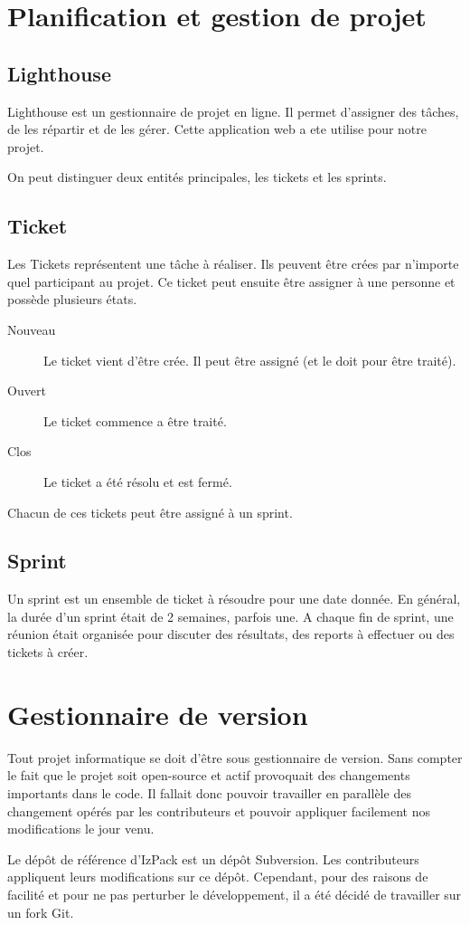 \section{Planification et gestion de projet}
\subsection{Lighthouse}
Lighthouse est un gestionnaire de projet en ligne. Il permet d'assigner des tâches, de les répartir et de les gérer.
Cette application web a ete utilise pour notre projet.

On peut distinguer deux entités principales, les tickets et les sprints.
\subsection{Ticket}
Les Tickets représentent une tâche à réaliser. Ils peuvent être crées par n'importe quel participant au projet. Ce ticket peut ensuite être assigner à une personne et possède plusieurs états.
\begin{description}
\item[Nouveau] Le ticket vient d'être crée. Il peut être assigné (et le doit pour être traité).
\item[Ouvert] Le ticket commence a être traité.
\item[Clos] Le ticket a été résolu et est fermé.
\end{description}
Chacun de ces tickets peut être assigné à un sprint.
\subsection{Sprint}
Un sprint est un ensemble de ticket à résoudre pour une date donnée. En général, la durée d'un sprint était de 2 semaines, parfois une. A chaque fin de sprint, une réunion était organisée pour discuter des résultats, des reports à effectuer ou des tickets à créer.
\section{Gestionnaire de version}
Tout projet informatique se doit d'être sous gestionnaire de version. Sans compter le fait que le projet soit open-source et actif provoquait des changements importants dans le code. Il fallait donc pouvoir travailler en parallèle des changement opérés par les contributeurs et pouvoir appliquer facilement nos modifications le jour venu.

Le dépôt de référence d'IzPack est un dépôt Subversion. Les contributeurs appliquent leurs modifications sur ce dépôt. Cependant, pour des raisons de facilité et pour ne pas perturber le développement, il a été décidé de travailler sur un fork Git.
